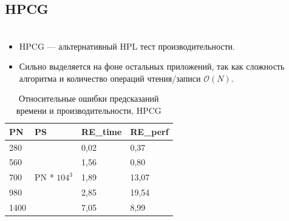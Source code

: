 \documentclass[unicode, t, 11pt]{beamer}%
\newlength{\mylen}
\begin{document}
					

	 		
		\subsection{HPCG}
			\begin{frame}
				\footnotesize
				\frametitle{\insertsection}
		 		\framesubtitle{\insertsubsection}
		 		\begin{columns}[T]
		 			\setlength{\mylen}{0.53\textwidth}
		 			\begin{column}{\mylen}
		 				\begin{itemize}[label = \(\bullet\)]
					 		\item HPCG — альтернативный HPL тест производительности.
					 		\item Сильно выделяется на фоне остальных приложений, так как сложность алгоритма и количество операций чтения/записи \(\mathcal{O}(N)\).
					 	\end{itemize}
					 	\begin{table}
				 			\captionsetup{font=tiny, labelfont=tiny}
				 			\tiny
								\begin{tabularx}{\textwidth}{|X|X|X|X|}
									\hline
								PN	& PS  & RE\_time & RE\_perf \\ \hline
								280 & \multirow{5}{*}{PN * \(104^3\)} & 0,02     & 0,37     \\ \cline{1-1} \cline{3-4}
								560 &     & 1,56     & 0,80     \\ \cline{1-1} \cline{3-4}
								700 &     & 1,89     & 13,07    \\ \cline{1-1} \cline{3-4}
								980	&     & 2,85     & 19,54    \\ \cline{1-1} \cline{3-4}
								1400 &    & 7,05     & 8,99     \\ \hline
								\end{tabularx}
							\caption{Относительные ошибки предсказаний времени и производительности, HPCG}
						\end{table}
					 			

\end{column}
\end{columns}
\end{frame}
\end{document}

